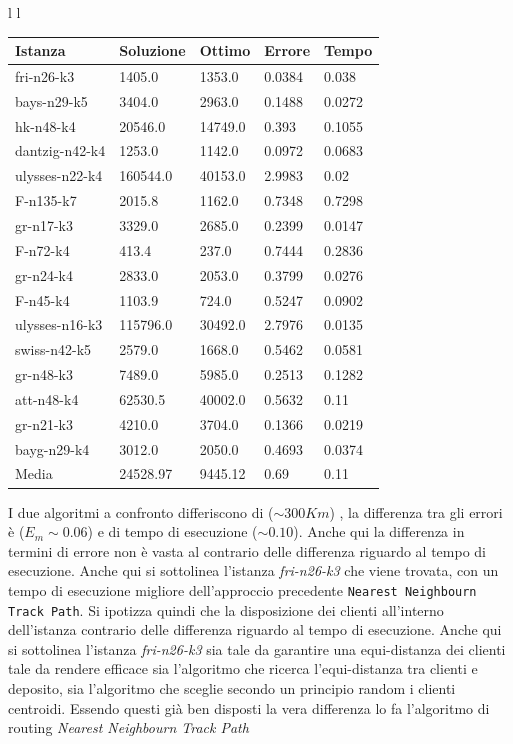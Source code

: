\documentclass[]{article}
\begin{document}
\begin{tabular}{l l}
	\small		
	\begin{tabular}{||l | l l l l||} 
		\hline
		Istanza & Soluzione & Ottimo & Errore & Tempo \\ [0.5ex] 
		\hline\hline
		\rowcolor{green}
		fri-n26-k3 & 1405.0 & 1353.0 & 0.0384 & 0.038  \\
		\rowcolor{white}
		bays-n29-k5 & 3404.0 & 2963.0 & 0.1488 & 0.0272  \\
		hk-n48-k4 & 20546.0 & 14749.0 & 0.393 & 0.1055  \\
		dantzig-n42-k4 & 1253.0 & 1142.0 & 0.0972 & 0.0683  \\
		ulysses-n22-k4 & 160544.0 & 40153.0 & 2.9983 & 0.02  \\
		F-n135-k7 & 2015.8 & 1162.0 & 0.7348 & 0.7298  \\
		gr-n17-k3 & 3329.0 & 2685.0 & 0.2399 & 0.0147  \\
		F-n72-k4 & 413.4 & 237.0 & 0.7444 & 0.2836  \\
		gr-n24-k4 & 2833.0 & 2053.0 & 0.3799 & 0.0276  \\
		F-n45-k4 & 1103.9 & 724.0 & 0.5247 & 0.0902  \\
		ulysses-n16-k3 & 115796.0 & 30492.0 & 2.7976 & 0.0135  \\
		swiss-n42-k5 & 2579.0 & 1668.0 & 0.5462 & 0.0581  \\
		gr-n48-k3 & 7489.0 & 5985.0 & 0.2513 & 0.1282  \\
		att-n48-k4 & 62530.5 & 40002.0 & 0.5632 & 0.11  \\
		gr-n21-k3 & 4210.0 & 3704.0 & 0.1366 & 0.0219  \\
		bayg-n29-k4 & 3012.0 & 2050.0 & 0.4693 & 0.0374  \\
		\hline
		Media & 24528.97 & 9445.12 & 0.69 & 0.11  \\	
		[1ex] 
		\hline
	\end{tabular}
	
\end{tabular}

I due algoritmi a confronto differiscono di ($\sim 300 Km$) , la differenza tra gli errori è ($ E_m\sim 0.06$) e di tempo di esecuzione ($ \sim 0.10$). Anche qui la differenza in termini di errore non è vasta al contrario delle differenza riguardo al tempo di esecuzione. Anche qui si sottolinea l'istanza \textit{fri-n26-k3} che viene trovata, con un tempo di esecuzione migliore dell'approccio precedente  \texttt{Nearest Neighbourn Track Path}. Si ipotizza quindi che la disposizione dei clienti all'interno dell'istanza contrario delle differenza riguardo al tempo di esecuzione. Anche qui si sottolinea l'istanza \textit{fri-n26-k3} sia tale da garantire una equi-distanza dei clienti tale da rendere efficace sia l'algoritmo che ricerca l'equi-distanza tra clienti e deposito, sia l'algoritmo che sceglie secondo un principio random i clienti centroidi. Essendo questi già ben disposti la vera differenza lo fa l'algoritmo di routing \textit{ Nearest Neighbourn Track Path}
\end{document}
